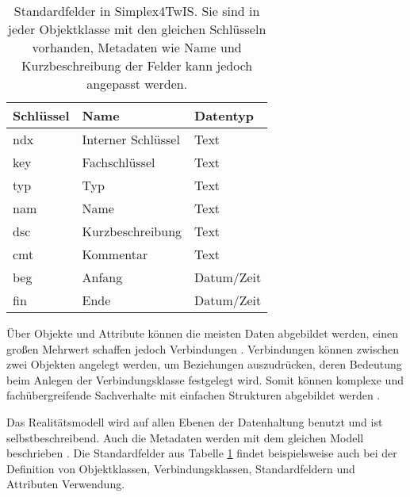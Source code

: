 \begin{table}[!ht]
  \centering
  \begin{tabular}{|| l | l | l ||}
    \hline
    Schlüssel & Name               & Datentyp   \\[0.5ex]
    \hline\hline
    ndx       & Interner Schlüssel & Text       \\
    key       & Fachschlüssel      & Text       \\
    typ       & Typ                & Text       \\
    nam       & Name               & Text       \\
    dsc       & Kurzbeschreibung   & Text       \\
    cmt       & Kommentar          & Text       \\
    beg       & Anfang             & Datum/Zeit \\
    fin       & Ende               & Datum/Zeit \\
    \hline
  \end{tabular}
  \caption[Standardfelder in Simplex4TwIS]{Standardfelder in Simplex4TwIS. Sie sind in jeder Objektklasse mit den gleichen Schlüsseln vorhanden, Metadaten wie Name und Kurzbeschreibung der Felder kann jedoch angepasst werden. \parencite{simplex4datagmbhSimplex4TwIS}}
  \label{tab:s4d-fields}
\end{table}

Über Objekte und Attribute können die meisten Daten abgebildet werden, einen großen Mehrwert schaffen jedoch Verbindungen \parencite{rudolfUmweltdatenIntelligenz2021}. Verbindungen können zwischen zwei Objekten angelegt werden, um Beziehungen auszudrücken, deren Bedeutung beim Anlegen der Verbindungsklasse festgelegt wird. Somit können komplexe und fachübergreifende Sachverhalte mit einfachen Strukturen abgebildet werden \parencite{grossmannFachsystemeSchemaevolution2024}.

Das Realitätsmodell wird auf allen Ebenen der Datenhaltung benutzt und ist selbstbeschreibend. Auch die Metadaten werden mit dem gleichen Modell beschrieben \parencite{grossmannFachsystemeSchemaevolution2024}. Die Standardfelder aus Tabelle \ref{tab:s4d-fields} findet beispielsweise auch bei der Definition von Objektklassen, Verbindungsklassen, Standardfeldern und Attributen Verwendung.

